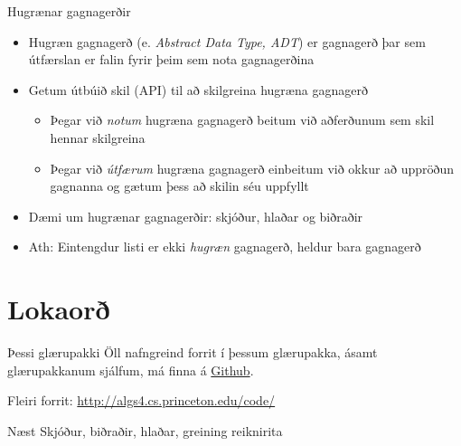 \documentclass{beamer}
\begin{document}
\begin{frame}{Hugrænar gagnagerðir}
	\begin{itemize}
		\item Hugræn gagnagerð (e. \emph{Abstract Data Type, ADT}) er gagnagerð þar sem útfærslan er falin fyrir þeim sem nota gagnagerðina
		\item Getum útbúið skil (API) til að skilgreina hugræna gagnagerð
		      \begin{itemize}
			      \item Þegar við \emph{notum} hugræna gagnagerð beitum við aðferðunum sem skil hennar skilgreina
			      \item Þegar við \emph{útfærum} hugræna gagnagerð einbeitum við okkur að uppröðun gagnanna og gætum þess að skilin séu uppfyllt
		      \end{itemize}
		\item Dæmi um hugrænar gagnagerðir: skjóður, hlaðar og biðraðir
		\item Ath: Eintengdur listi er ekki \emph{hugræn} gagnagerð, heldur bara gagnagerð 
	\end{itemize}
\end{frame}
\section{Lokaorð}

\begin{frame}{Þessi glærupakki}
	Öll nafngreind forrit í þessum glærupakka, ásamt glærupakkanum sjálfum, má finna á  \href{https://github.com/Ernir/kennsluefni/tree/master/T2/Code/w4}{Github}.

	Fleiri forrit: \url{http://algs4.cs.princeton.edu/code/}
\end{frame}


\begin{frame}{Næst}
	Skjóður, biðraðir, hlaðar, greining reiknirita
\end{frame}
\end{document}
